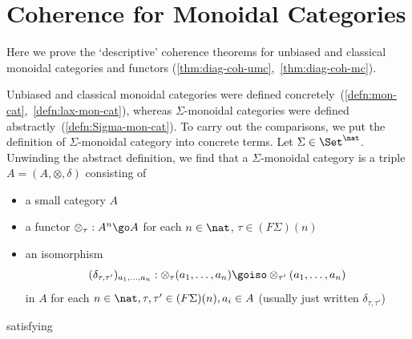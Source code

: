 
\chapter{Coherence for Monoidal Categories}
%
%
%
%
%
%
%


\noindent
Here we prove the `descriptive' coherence theorems for unbiased and
classical monoidal categories and functors
(\ref{thm:diag-coh-umc},~\ref{thm:diag-coh-mc}).

Unbiased and classical monoidal categories were defined
concretely~(\ref{defn:mon-cat},~\ref{defn:lax-mon-cat}), whereas
$\Sigma$-monoidal categories were defined
abstractly~(\ref{defn:Sigma-mon-cat}).  To carry out the comparisons, we
put the definition of $\Sigma$-monoidal category into concrete terms.  Let
$\Sigma \in \Set^\nat$.  Unwinding the abstract definition, we find that a
$\Sigma$-monoidal category is a triple $A = (A, \otimes, \delta)$%
% 
% 
consisting of
%
\begin{itemize}
\item a small category $A$
\item a functor $\otimes_\tau: A^n \go A$%
% 
%  
for each $n\in\nat$,
$\tau\in (F\Sigma)(n)$
\item an isomorphism
\[
(\delta_{\tau, \tau'})_{a_1, \ldots, a_n}:
\otimes_\tau(a_1, \ldots, a_n)
\goiso
\otimes_{\tau'}(a_1, \ldots, a_n)
\]
in $A$ for each $n\in\nat, \tau, \tau' \in (F\Sigma)(n), a_i \in A$
(usually just written $\delta_{\tau, \tau'}$)
\end{itemize}
%
satisfying 
%
